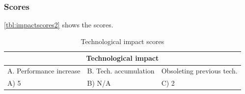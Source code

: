 \subsubsection{Scores}
\autoref{tbl:impactscores2} shows the scores.
\begin{table}[h]
\centering
\begin{tabular}{l l l}
\hline
\multicolumn{3}{|c|}{Technological impact} \\
\hline
A. Performance increase & B. Tech. accumulation & Obsoleting previous tech.\\
A) 5 & B) N/A & C) 2\\ 
\hline
\end{tabular}
\caption{Technological impact scores}
\label{tbl:impactscores2}
\end{table}
